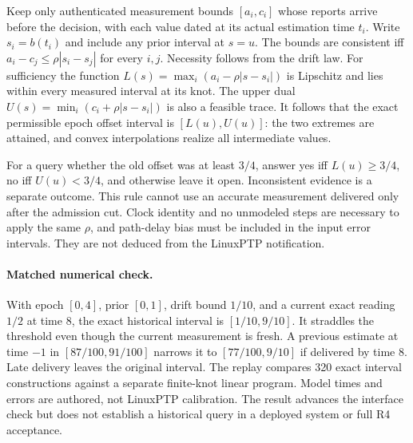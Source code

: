 \documentclass[11pt]{article}
\begin{document}
Keep only authenticated measurement bounds \([a_i,c_i]\)
whose reports arrive before the decision, with each value dated
at its actual estimation time \(t_i\). Write \(s_i=b(t_i)\)
and include any prior interval at \(s=u\). The bounds are
consistent iff \(a_i-c_j\le\rho|s_i-s_j|\) for every \(i,j\).
Necessity follows from the drift law. For sufficiency the
function \(L(s)=\max_i(a_i-\rho |s-s_i|)\) is Lipschitz and
lies within every measured interval at its knot. The upper
dual \(U(s)=\min_i(c_i+\rho|s-s_i|)\) is also a feasible trace.
It follows that the exact permissible epoch offset interval
is \([L(u),U(u)]\): the two extremes are attained, and convex
interpolations realize all intermediate values.

For a query whether the old offset was at least \(3/4\),
answer yes iff \(L(u)\ge3/4\), no iff \(U(u)<3/4\), and otherwise
leave it open. Inconsistent evidence is a separate outcome.
This rule cannot use an accurate measurement delivered only
after the admission cut. Clock identity and no unmodeled steps
are necessary to apply the same \(\rho\), and path-delay bias
must be included in the input error intervals. They are not
deduced from the LinuxPTP notification.

\paragraph{Matched numerical check.}
With epoch \([0,4]\), prior \([0,1]\), drift bound \(1/10\),
and a current exact reading \(1/2\) at time 8, the exact historical
interval is \([1/10,9/10]\). It straddles the threshold even
though the current measurement is fresh. A previous estimate at
time \(-1\) in \([87/100,91/100]\) narrows it to
\([77/100,9/10]\) if delivered by time 8. Late delivery leaves
the original interval. The replay compares 320 exact interval
constructions against a separate finite-knot linear program.
Model times and errors are authored, not LinuxPTP calibration.
The result advances the interface check but does not establish a
historical query in a deployed system or full R4 acceptance.
\end{document}
